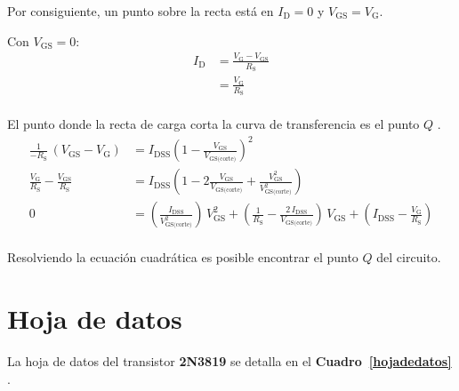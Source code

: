 \documentclass[letter,twoside,11pt]{article}
\begin{document}
Por consiguiente, un punto sobre la recta está en $I_{\text{D}} = 0$ y
$V_{\text{GS}} = V_{\text{G}}$.

Con $V_{\text{GS}} = 0$:
\begin{equation*}
    \begin{split}
        I_\text{D} &= \frac{V_{\text{G}} - V_{\text{GS}}}{R_{\text{S}}}\\
                   &= \frac{V_{\text{G}}}{R_{\text{S}}}\\
    \end{split}
\end{equation*}

El punto donde la recta de carga corta la curva de transferencia es el punto
$Q$ \cite{Floyd}.
\begin{equation*}
    \begin{split}
        \frac{1}{-R_{\text{S}}}\,(V_{\text{GS}}-V_{\text{G}}) &=
        I_{\text{DSS}}
        \left(1-\frac{V_{\text{GS}}}{V_{\text{GS(corte)}}}\right)^2\\
        \frac{V_{\text{G}}}{R_{\text{S}}}-\frac{V_{\text{GS}}}{R_{\text{S}}} &=
        I_{\text{DSS}}
        \left(1-2\frac{V_{\text{GS}}}{V_{\text{GS(corte)}}}+
        \frac{V_{\text{GS}}^2}{V_{\text{GS(corte)}}^2}\right)\\
        0 &= \left(\frac{I_{\text{DSS}}}{V_{\text{GS(corte)}}^2}\right)\,
        V_{\text{GS}}^2 + \left(\frac{1}{R_{\text{S}}}-
        \frac{2\,I_{\text{DSS}}}{V_{\text{GS(corte)}}}\right)\,
        V_{\text{GS}}+
        \left(I_{\text{DSS}}-\frac{V_{\text{G}}}{R_{\text{S}}}\right)\\
    \end{split}
\end{equation*}

Resolviendo la ecuación cuadrática es posible encontrar el punto $Q$ del
circuito.

\section{Hoja de datos}
La hoja de datos del transistor \textbf{2N3819} se detalla en el
\textbf{Cuadro~\ref{hojadedatos}} \cite{2N3819}.
\end{document}
